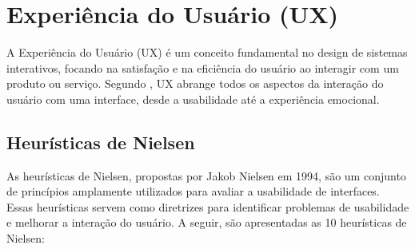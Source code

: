 \section{Experiência do Usuário (UX)}
A Experiência do Usuário (UX) é um conceito fundamental no design de sistemas interativos, focando na satisfação e na eficiência do usuário ao interagir com um produto ou serviço. Segundo \cite{Norman}, UX abrange todos os aspectos da interação do usuário com uma interface, desde a usabilidade até a experiência emocional.

\subsection{Heurísticas de Nielsen}
As heurísticas de Nielsen, propostas por Jakob Nielsen em 1994, são um conjunto de princípios amplamente utilizados para avaliar a usabilidade de interfaces. Essas heurísticas servem como diretrizes para identificar problemas de usabilidade e melhorar a interação do usuário. A seguir, são apresentadas as 10 heurísticas de Nielsen:

